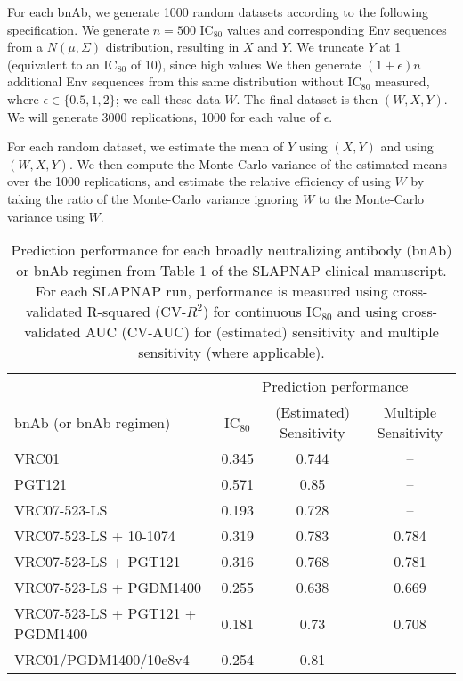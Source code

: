 \documentclass[10pt]{article}
\begin{document}
For each bnAb, we generate 1000 random datasets according to the following specification. We generate $n = 500$ IC$_{80}$ values and corresponding Env sequences from a $N(\mu, \Sigma)$ distribution, resulting in $X$ and $Y$. We truncate $Y$ at 1 (equivalent to an IC$_{80}$ of 10), since high values  We then generate $(1 + \epsilon)n$ additional Env sequences from this same distribution without IC$_{80}$ measured, where $\epsilon \in \{0.5, 1, 2\}$; we call these data $W$. The final dataset is then $(W, X, Y)$. We will generate 3000 replications, 1000 for each value of $\epsilon$.

For each random dataset, we estimate the mean of $Y$ using $(X,Y)$ and using $(W,X,Y)$. We then compute the Monte-Carlo variance of the estimated means over the 1000 replications, and estimate the relative efficiency of using $W$ by taking the ratio of the Monte-Carlo variance ignoring $W$ to the Monte-Carlo variance using $W$.

\begin{table}
    \centering
    \caption{Prediction performance for each broadly neutralizing antibody (bnAb) or bnAb regimen from Table 1 of the SLAPNAP clinical manuscript. For each SLAPNAP run, performance is measured using cross-validated R-squared (CV-$R^2$) for continuous IC$_{80}$ and using cross-validated AUC (CV-AUC) for (estimated) sensitivity and multiple sensitivity (where applicable).}
    \begin{tabular}{l|ccc}
        & \multicolumn{3}{c}{Prediction performance} \\
        bnAb (or bnAb regimen) & IC$_{80}$ & (Estimated) Sensitivity & Multiple Sensitivity \\
        \hline
        VRC01 & 0.345 & 0.744 & -- \\
        PGT121 & 0.571 & 0.85 & -- \\
        VRC07-523-LS & 0.193 & 0.728 & --\\
        VRC07-523-LS + 10-1074 & 0.319 & 0.783 & 0.784 \\
        VRC07-523-LS + PGT121 & 0.316 & 0.768 & 0.781 \\
        VRC07-523-LS + PGDM1400 & 0.255 & 0.638 & 0.669 \\
        VRC07-523-LS + PGT121 + PGDM1400 & 0.181 & 0.73 & 0.708 \\
        VRC01/PGDM1400/10e8v4 & 0.254 & 0.81 & --
    \end{tabular}
    \label{tab:perf}
\end{table}
\end{document}
